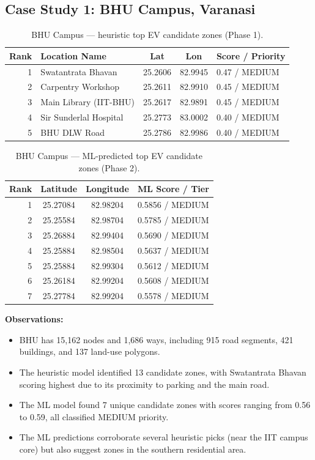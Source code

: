 \documentclass[12pt, a4paper]{article}
\begin{document}
\subsection{Case Study 1: BHU Campus, Varanasi}

\begin{table}[H]
\centering
\caption{BHU Campus — heuristic top EV candidate zones (Phase 1).}
\label{tab:bhu_heuristic}
\begin{tabular}{@{}rlccl@{}}
\toprule
\textbf{Rank} & \textbf{Location Name} & \textbf{Lat} & \textbf{Lon} & \textbf{Score / Priority} \\
\midrule
1 & Swatantrata Bhavan & 25.2606 & 82.9945 & 0.47 / MEDIUM \\
2 & Carpentry Workshop & 25.2611 & 82.9910 & 0.45 / MEDIUM \\
3 & Main Library (IIT-BHU) & 25.2617 & 82.9891 & 0.45 / MEDIUM \\
4 & Sir Sunderlal Hospital & 25.2773 & 83.0002 & 0.40 / MEDIUM \\
5 & BHU DLW Road & 25.2786 & 82.9986 & 0.40 / MEDIUM \\
\bottomrule
\end{tabular}
\end{table}

\begin{table}[H]
\centering
\caption{BHU Campus — ML-predicted top EV candidate zones (Phase 2).}
\label{tab:bhu_ml}
\begin{tabular}{@{}rccl@{}}
\toprule
\textbf{Rank} & \textbf{Latitude} & \textbf{Longitude} & \textbf{ML Score / Tier} \\
\midrule
1 & 25.27084 & 82.98204 & 0.5856 / MEDIUM \\
2 & 25.25584 & 82.98704 & 0.5785 / MEDIUM \\
3 & 25.26884 & 82.99404 & 0.5690 / MEDIUM \\
4 & 25.25884 & 82.98504 & 0.5637 / MEDIUM \\
5 & 25.25884 & 82.99304 & 0.5612 / MEDIUM \\
6 & 25.26184 & 82.99204 & 0.5608 / MEDIUM \\
7 & 25.27784 & 82.99204 & 0.5578 / MEDIUM \\
\bottomrule
\end{tabular}
\end{table}

\textbf{Observations:}
\begin{itemize}
    \item BHU has 15,162 nodes and 1,686 ways, including 915 road 
    segments, 421 buildings, and 137 land-use polygons.
    \item The heuristic model identified 13 candidate zones, with 
    Swatantrata Bhavan scoring highest due to its proximity to 
    parking and the main road.
    \item The ML model found 7 unique candidate zones with scores 
    ranging from 0.56 to 0.59, all classified MEDIUM priority.
    \item The ML predictions corroborate several heuristic picks 
    (near the IIT campus core) but also suggest zones in the 
    southern residential area.
\end{itemize}
\end{document}
